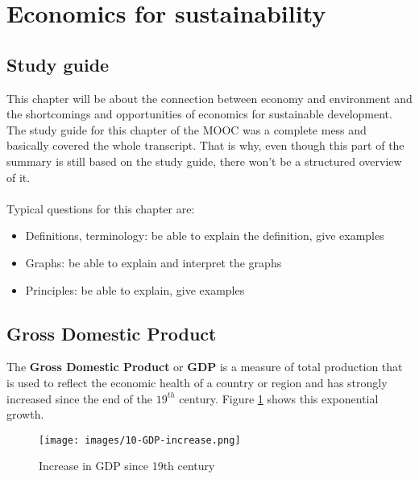 \documentclass[../summary.tex]{subfiles}
\begin{document}
	
	\section{Economics for sustainability}
	
	\subsection{Study guide}
	
	This chapter will be about the connection between economy and environment and the shortcomings and opportunities of economics for sustainable development. The study guide for this chapter of the MOOC was a complete mess and basically covered the whole transcript. That is why, even though this part of the summary is still based on the study guide, there won't be a structured overview of it.
	\\\\
	Typical questions for this chapter are:
	\begin{itemize}
		\item Definitions, terminology: be able to explain the definition, give examples
		\item Graphs: be able to explain and interpret the graphs
		\item Principles: be able to explain, give examples
	\end{itemize}
	
	\subsection{Gross Domestic Product}
	\label{sec:10-gdp}
	
	The \textbf{Gross Domestic Product} or \textbf{GDP} is a measure of total production that is used to reflect the economic health of a country or region and has strongly increased since the end of the $19^{th}$ century. Figure \ref{fig:GDP} shows this exponential growth.
		
	\begin{figure}[htbp]
		\centering
		\texttt{[image: images/10-GDP-increase.png]}
		\caption{Increase in GDP since 19th century}
		\label{fig:GDP}
	\end{figure}
	
\end{document}
